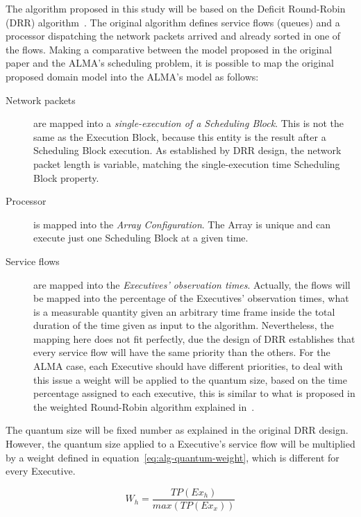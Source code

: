 The algorithm proposed in this study will be based on the Deficit Round-Robin (DRR) algorithm~\cite{shreedhar96}. The original algorithm defines service flows (queues) and a processor dispatching the network packets arrived and already sorted in one of the flows. Making a comparative between the model proposed in the original paper and the ALMA's scheduling problem, it is possible to map the original proposed domain model into the ALMA's model as follows:

\begin{description}
\item[Network packets] are mapped into a \textit{single-execution of a Scheduling Block}. This is not the same as the Execution Block, because this entity is the result after a Scheduling Block execution. As established by DRR design, the network packet length is variable, matching the single-execution time Scheduling Block property.

\item[Processor] is mapped into the \textit{Array Configuration}. The Array is unique and can execute just one Scheduling Block at a given time.

\item[Service flows] are mapped into the \textit{Executives' observation times}. Actually, the flows will be mapped into the percentage of the Executives' observation times, what is a measurable quantity given an arbitrary time frame inside the total duration of the time given as input to the algorithm. Nevertheless, the mapping here does not fit perfectly, due the design of DRR establishes that every service flow will have the same priority than the others. For the ALMA case, each Executive should have different priorities, to deal with this issue a weight will be applied to the quantum size, based on the time percentage assigned to each executive, this is similar to what is proposed in the weighted Round-Robin algorithm explained in~\cite{katevenis91}.
\end{description}

The quantum size will be fixed number as explained in the original DRR design. However, the quantum size applied to a Executive's service flow will be multiplied by a weight defined in equation~\ref{eq:alg-quantum-weight}, which is different for every Executive.

\begin{equation}
\label{eq:alg-quantum-weight}
W_{h} = \frac{TP(Ex_h)}{max(TP(Ex_x))}
\end{equation}


